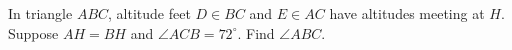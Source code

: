 In triangle $ ABC $, altitude feet $ D\in BC $ and $ E\in AC $ have altitudes meeting at $ H $. Suppose $ AH=BH $ and $\angle ACB=72^\circ $. Find $\angle ABC $.
